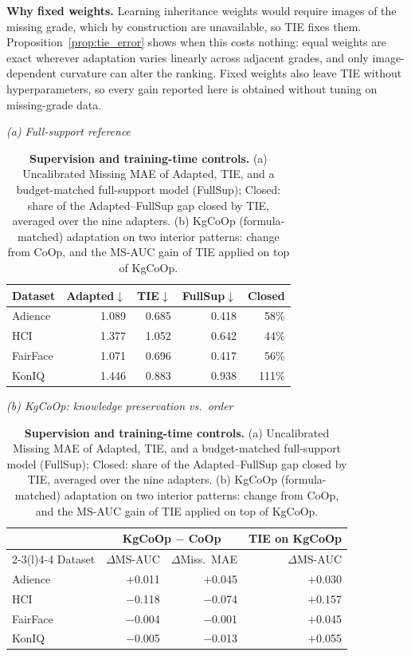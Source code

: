 \noindent\textbf{Why fixed weights.}
Learning inheritance weights would require images of the missing grade, which by construction are unavailable, so TIE fixes them.
Proposition~\ref{prop:tie_error} shows when this costs nothing: equal weights are exact wherever adaptation varies linearly across adjacent grades, and only image-dependent curvature can alter the ranking.
Fixed weights also leave TIE without hyperparameters, so every gain reported here is obtained without tuning on missing-grade data.


\begin{table}[t]
\centering
\caption{\textbf{Supervision and training-time controls.}
(a) Uncalibrated Missing MAE of Adapted, TIE, and a budget-matched full-support model (FullSup); Closed: share of the Adapted--FullSup gap closed by TIE, averaged over the nine adapters.
(b) KgCoOp (formula-matched) adaptation on two interior patterns: change from CoOp, and the MS-AUC gain of TIE applied on top of KgCoOp.}
\label{tab:controls}
\small
\setlength{\tabcolsep}{4pt}
\textit{(a) Full-support reference}\par\vspace{2pt}
\begin{tabular*}{\columnwidth}{@{\extracolsep{\fill}}lrrrr@{}}
\toprule
Dataset & Adapted$\downarrow$ & TIE$\downarrow$ & FullSup$\downarrow$ & Closed \\
\midrule
Adience & 1.089 & 0.685 & 0.418 & 58\% \\
HCI & 1.377 & 1.052 & 0.642 & 44\% \\
FairFace & 1.071 & 0.696 & 0.417 & 56\% \\
KonIQ & 1.446 & 0.883 & 0.938 & 111\% \\
\bottomrule
\end{tabular*}
\par\vspace{6pt}
\textit{(b) KgCoOp: knowledge preservation vs.\ order}\par\vspace{2pt}
\begin{tabular*}{\columnwidth}{@{\extracolsep{\fill}}lrrr@{}}
\toprule
& \multicolumn{2}{c}{KgCoOp $-$ CoOp} & TIE on KgCoOp \\
\cmidrule(lr){2-3}\cmidrule(l){4-4}
Dataset & $\Delta$MS-AUC & $\Delta$Miss.\ MAE & $\Delta$MS-AUC \\
\midrule
Adience & $+$0.011 & $+$0.045 & $+$0.030 \\
HCI & $-$0.118 & $-$0.074 & $+$0.157 \\
FairFace & $-$0.004 & $-$0.001 & $+$0.045 \\
KonIQ & $-$0.005 & $-$0.013 & $+$0.055 \\
\bottomrule
\end{tabular*}
\end{table}


